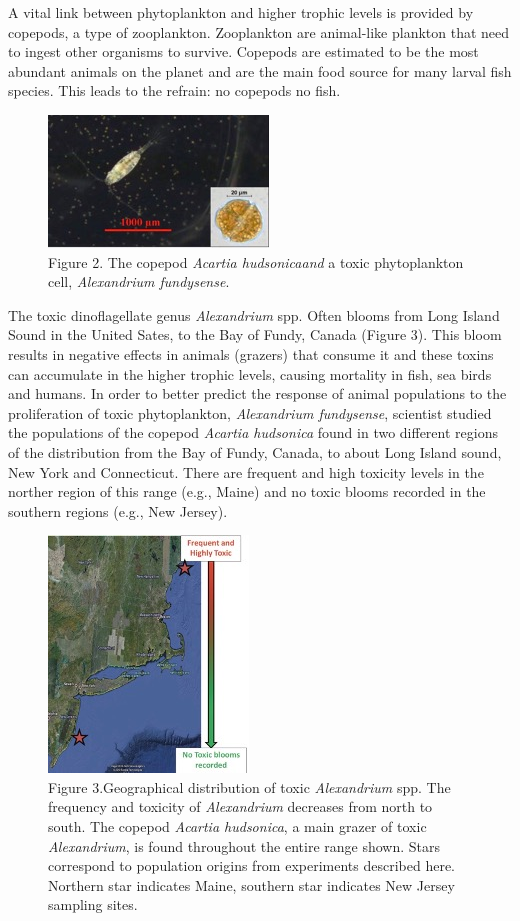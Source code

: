 \documentclass[
]{book}
\begin{document}
A vital link between phytoplankton and higher trophic levels is provided by copepods, a type of zooplankton. Zooplankton are animal-like plankton that need to ingest other organisms to survive. Copepods are estimated to be the most abundant animals on the planet and are the main food source for many larval fish species. This leads to the refrain: no copepods no fish.

\begin{figure}
\centering
\includegraphics{images/figure2.png}
\caption{Figure 2. The copepod \emph{Acartia hudsonicaand} a toxic phytoplankton cell, \emph{Alexandrium fundysense}.}
\end{figure}

The toxic dinoflagellate genus \emph{Alexandrium} spp. Often blooms from Long Island Sound in the United Sates, to the Bay of Fundy, Canada (Figure 3). This bloom results in negative effects in animals (grazers) that consume it and these toxins can accumulate in the higher trophic levels, causing mortality in fish, sea birds and humans. In order to better predict the response of animal populations to the proliferation of toxic phytoplankton, \emph{Alexandrium fundysense}, scientist studied the populations of the copepod \emph{Acartia hudsonica} found in two different regions of the distribution from the Bay of Fundy, Canada, to about Long Island sound, New York and Connecticut. There are frequent and high toxicity levels in the norther region of this range (e.g., Maine) and no toxic blooms recorded in the southern regions (e.g., New Jersey).

\begin{figure}
\centering
\includegraphics{images/figure3.png}
\caption{Figure 3.Geographical distribution of toxic \emph{Alexandrium} spp. The frequency and toxicity of \emph{Alexandrium} decreases from north to south. The copepod \emph{Acartia hudsonica}, a main grazer of toxic \emph{Alexandrium}, is found throughout the entire range shown. Stars correspond to population origins from experiments described here. Northern star indicates Maine, southern star indicates New Jersey sampling sites.}
\end{figure}
\end{document}
